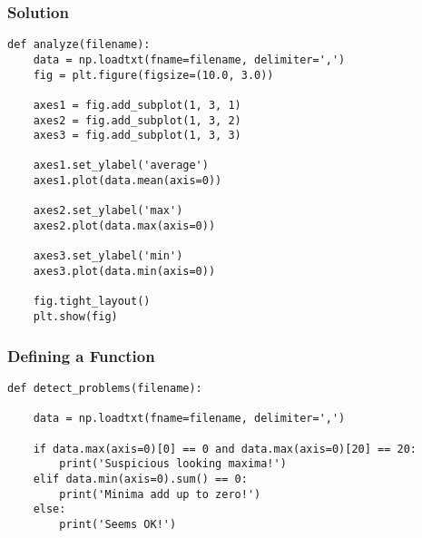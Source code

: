 \documentclass{beamer}
\begin{document}
\begin{frame}[fragile]
\frametitle{Solution}
\small{
\begin{verbatim}
def analyze(filename):
    data = np.loadtxt(fname=filename, delimiter=',')
    fig = plt.figure(figsize=(10.0, 3.0))

    axes1 = fig.add_subplot(1, 3, 1)
    axes2 = fig.add_subplot(1, 3, 2)
    axes3 = fig.add_subplot(1, 3, 3)

    axes1.set_ylabel('average')
    axes1.plot(data.mean(axis=0))

    axes2.set_ylabel('max')
    axes2.plot(data.max(axis=0))

    axes3.set_ylabel('min')
    axes3.plot(data.min(axis=0))

    fig.tight_layout()
    plt.show(fig)
\end{verbatim}}
\end{frame}


\begin{frame}[fragile]
\frametitle{Defining a Function}
\begin{verbatim}
def detect_problems(filename):

    data = np.loadtxt(fname=filename, delimiter=',')

    if data.max(axis=0)[0] == 0 and data.max(axis=0)[20] == 20:
        print('Suspicious looking maxima!')
    elif data.min(axis=0).sum() == 0:
        print('Minima add up to zero!')
    else:
        print('Seems OK!')
\end{verbatim}
\end{frame}
\end{document}
